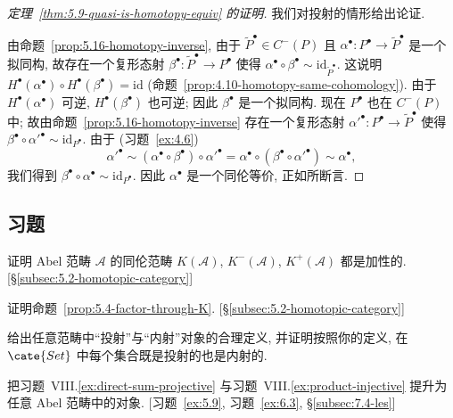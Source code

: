 \begin{proof}[定理~\ref{thm:5.9-quasi-is-homotopy-equiv} 的证明]
我们对投射的情形给出论证.

由命题~\ref{prop:5.16-homotopy-inverse}, 由于 $\widetilde P^\bullet\in C^-(P)$ 且 $\alpha^\bullet:P^\bullet\to\widetilde{P}^\bullet$ 是一个拟同构, 故存在一个复形态射 $\beta^\bullet:\widetilde{P}^\bullet\to P^\bullet$ 使得 $\alpha^\bullet\circ\beta^\bullet\sim\mathrm{id}_{\widetilde P^\bullet}$. 这说明 $H^\bullet(\alpha^\bullet)\circ H^\bullet(\beta^\bullet)=\mathrm{id}$ (命题~\ref{prop:4.10-homotopy-same-cohomology}). 由于 $H^\bullet(\alpha^\bullet)$ 可逆, $H^\bullet(\beta^\bullet)$ 也可逆; 因此 $\beta^\bullet$ 是一个拟同构. 现在 $P^\bullet$ 也在 $C^-(P)$ 中; 故由命题~\ref{prop:5.16-homotopy-inverse} 存在一个复形态射 $\alpha'^\bullet:P^\bullet\to\widetilde{P}^\bullet$ 使得 $\beta^\bullet\circ\alpha'^\bullet\sim\mathrm{id}_{P^\bullet}$. 由于 (习题~\ref{ex:4.6})
\[
\alpha'^\bullet\sim(\alpha^\bullet\circ\beta^\bullet)\circ\alpha'^\bullet=\alpha^\bullet\circ(\beta^\bullet\circ\alpha'^\bullet)\sim\alpha^\bullet,
\]
我们得到 $\beta^\bullet\circ\alpha^\bullet\sim\mathrm{id}_{P^\bullet}$. 因此 $\alpha^\bullet$ 是一个同伦等价, 正如所断言.
\end{proof}

\subsection*{习题}
{}

\begin{prob}\label{ex:5.1}
证明 Abel 范畴 $\mathcal{A}$ 的同伦范畴 $K(\mathcal{A})$, $K^-(\mathcal{A})$, $K^+(\mathcal{A})$ 都是加性的. [\S\ref{subsec:5.2-homotopic-category}]
\end{prob}

\begin{prob}\label{ex:5.2}
证明命题~\ref{prop:5.4-factor-through-K}. [\S\ref{subsec:5.2-homotopic-category}]
\end{prob}

\begin{prob}\label{ex:5.3}
给出任意范畴中``投射''与``内射''对象的合理定义, 并证明按照你的定义, 在 $\cate{Set}$ 中每个集合既是投射的也是内射的.
\end{prob}

\begin{prob}\label{ex:5.4}
把习题~VIII.\ref{ex:direct-sum-projective} 与习题~VIII.\ref{ex:product-injective} 提升为任意 Abel 范畴中的对象. [习题~\ref{ex:5.9}, 习题~\ref{ex:6.3}, \S\ref{subsec:7.4-les}]
\end{prob}

